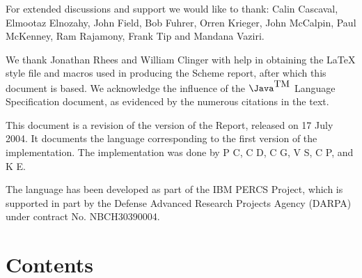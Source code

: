 For extended discussions and support we would like to thank: Calin
Cascaval, Elmootaz Elnozahy, John Field, Bob Fuhrer, Orren Krieger,
John McCalpin, Paul McKenney, Ram Rajamony, Frank Tip and Mandana
Vaziri.

We thank Jonathan Rhees and William Clinger with help in
obtaining the \LaTeX{} style file and macros used in producing the
Scheme report, after which this document is based. We acknowledge
the influence of the $\mbox{\Java}^{\mbox{TM}}$ Language Specification \cite{jls2} document,
as evidenced by the numerous citations in the text.

This document is a revision of the {} version of the Report,
released on 17 July 2004. It documents the language corresponding to
the first version of the implementation.  The implementation was done
by P C, 
C D, 
C G, 
V S,
C P, and 
K E.

The \Xten{} language has been developed as part of the IBM PERCS
Project, which is supported in part by the Defense Advanced Research
Projects Agency (DARPA) under contract No. NBCH30390004.


\vfill
\eject


\chapter*{Contents}
\addvspace{3.5pt}                  %
\renewcommand{\tocshrink}{-3.5pt}  %
{\footnotesize
\tableofcontents
}

\vfill
\eject



